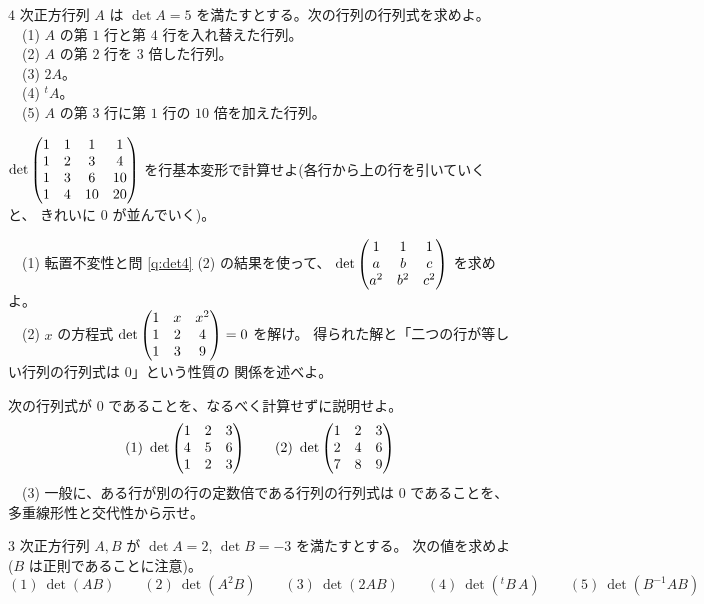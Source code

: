 \begin{mondai}[基本]\label{q:gendet-ex4}
$4$ 次正方行列 $A$ は $\det A = 5$ を満たすとする。次の行列の行列式を求めよ。\\
　(1) $A$ の第 $1$ 行と第 $4$ 行を入れ替えた行列。\\
　(2) $A$ の第 $2$ 行を $3$ 倍した行列。\\
　(3) $2A$。\\
　(4) ${}^t\!A$。\\
　(5) $A$ の第 $3$ 行に第 $1$ 行の $10$ 倍を加えた行列。
\end{mondai}

\begin{mondai}[標準]\label{q:gendet-ex5}
$\det \begin{pmatrix}1 & 1 & 1 & 1 \\ 1 & 2 & 3 & 4 \\ 1 & 3 & 6 & 10 \\ 1 & 4 & 10 & 20\end{pmatrix}$
を行基本変形で計算せよ(各行から上の行を引いていくと、
きれいに $0$ が並んでいく)。
\end{mondai}

\begin{mondai}[標準]\label{q:gendet-ex6}
　(1) 転置不変性と問 \ref{q:det4} (2) の結果を使って、
$\det \begin{pmatrix}1 & 1 & 1 \\ a & b & c \\ a^2 & b^2 & c^2\end{pmatrix}$ を求めよ。\\
　(2) $x$ の方程式
$\det \begin{pmatrix}1 & x & x^2 \\ 1 & 2 & 4 \\ 1 & 3 & 9\end{pmatrix} = 0$ を解け。
得られた解と「二つの行が等しい行列の行列式は $0$」という性質の
関係を述べよ。
\end{mondai}

\begin{mondai}[標準]\label{q:gendet-ex7}
次の行列式が $0$ であることを、なるべく計算せずに説明せよ。
\[
(1)\ \det \begin{pmatrix}1 & 2 & 3 \\ 4 & 5 & 6 \\ 1 & 2 & 3\end{pmatrix} \qquad
(2)\ \det \begin{pmatrix}1 & 2 & 3 \\ 2 & 4 & 6 \\ 7 & 8 & 9\end{pmatrix}
\]
　(3) 一般に、ある行が別の行の定数倍である行列の行列式は $0$ であることを、
多重線形性と交代性から示せ。
\end{mondai}

\begin{mondai}[標準]\label{q:gendet-ex8}
$3$ 次正方行列 $A, B$ が $\det A = 2$, $\det B = -3$ を満たすとする。
次の値を求めよ($B$ は正則であることに注意)。
\[
(1)\ \det(AB) \qquad (2)\ \det(A^2 B) \qquad (3)\ \det(2AB) \qquad
(4)\ \det({}^t\!B\,A) \qquad (5)\ \det(B^{-1}AB)
\]
\end{mondai}

